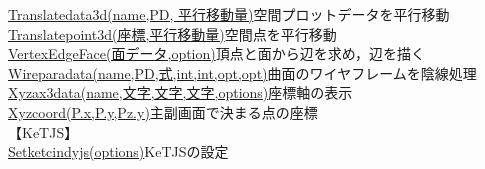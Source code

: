 \documentclass[papersize,a4paper,12pt,uplatex]{jsarticle}
\begin{document}
\begin{tabbing}
\hyperlink{translatedata3d}{Translatedata3d(name,PD, 平行移動量)}\>空間プロットデータを平行移動\\
\hyperlink{translatepoint3d}{Translatepoint3d(座標,平行移動量)}\>空間点を平行移動\\
\hyperlink{vertexedgeface}{VertexEdgeFace(面データ,option)}\>頂点と面から辺を求め，辺を描く\\
\hyperlink{wireparadata}{Wireparadata(name,PD,式,int,int,opt,opt)}\>曲面のワイヤフレームを陰線処理\\
\hyperlink{xyzax3data}{Xyzax3data(name,文字,文字,文字,options)}\>座標軸の表示\\
\hyperlink{xyzcoord}{Xyzcoord(P.x,P.y,Pz.y)}\>主副画面で決まる点の座標\\
【KeTJS】\\
\hyperlink{setketcindyjs}{Setketcindyjs(options)}\>KeTJSの設定\\

\end{tabbing}
\end{document}
